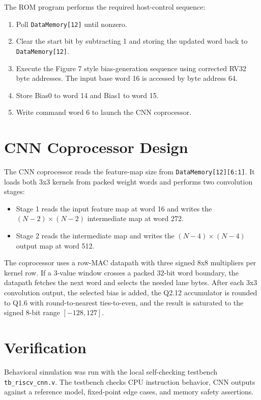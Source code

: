 \documentclass[11pt]{article}
\begin{document}
The ROM program performs the required host-control sequence:
\begin{enumerate}
  \item Poll \texttt{DataMemory[12]} until nonzero.
  \item Clear the start bit by subtracting 1 and storing the updated word back to \texttt{DataMemory[12]}.
  \item Execute the Figure 7 style bias-generation sequence using corrected RV32 byte addresses. The input base word 16 is accessed by byte address 64.
  \item Store Bias0 to word 14 and Bias1 to word 15.
  \item Write command word 6 to launch the CNN coprocessor.
\end{enumerate}

\section{CNN Coprocessor Design}

The CNN coprocessor reads the feature-map size from \texttt{DataMemory[12][6:1]}. It loads both 3x3 kernels from packed weight words and performs two convolution stages:

\begin{itemize}
  \item Stage 1 reads the input feature map at word 16 and writes the \((N-2)\times(N-2)\) intermediate map at word 272.
  \item Stage 2 reads the intermediate map and writes the \((N-4)\times(N-4)\) output map at word 512.
\end{itemize}

The coprocessor uses a row-MAC datapath with three signed 8x8 multipliers per kernel row. If a 3-value window crosses a packed 32-bit word boundary, the datapath fetches the next word and selects the needed lane bytes. After each 3x3 convolution output, the selected bias is added, the Q2.12 accumulator is rounded to Q1.6 with round-to-nearest ties-to-even, and the result is saturated to the signed 8-bit range \([-128, 127]\).

\section{Verification}

Behavioral simulation was run with the local self-checking testbench \texttt{tb\_riscv\_cnn.v}. The testbench checks CPU instruction behavior, CNN outputs against a reference model, fixed-point edge cases, and memory safety assertions.
\end{document}
